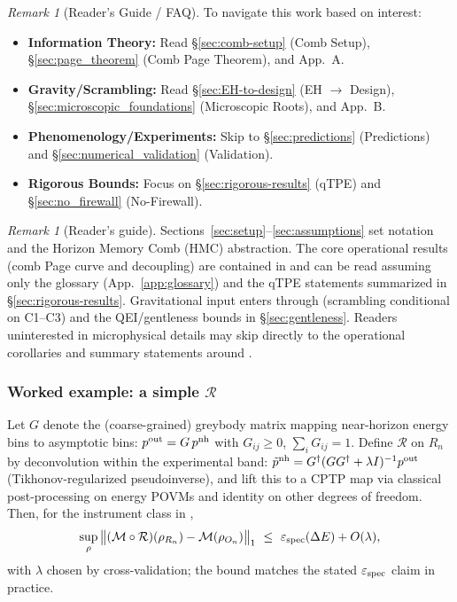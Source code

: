 \documentclass[aps,prd,preprint,onecolumn,superscriptaddress,nofootinbib,longbibliography,floatfix,11pt,showpacs,showkeys]{revtex4-2}
\theoremstyle{plain}
\theoremstyle{definition}
\theoremstyle{remark}
\newtheorem{remark}[theorem]{Remark}
\begin{document}
\begin{remark}[Reader's Guide / FAQ]
To navigate this work based on interest:
\begin{itemize}[leftmargin=*,itemsep=0pt]
    \item \textbf{Information Theory:} Read \S\ref{sec:comb-setup} (Comb Setup), \S\ref{sec:page_theorem} (Comb Page Theorem), and App.~A.
    \item \textbf{Gravity/Scrambling:} Read \S\ref{sec:EH-to-design} (EH $\to$ Design), \S\ref{sec:microscopic_foundations} (Microscopic Roots), and App.~B.
    \item \textbf{Phenomenology/Experiments:} Skip to \S\ref{sec:predictions} (Predictions) and \S\ref{sec:numerical_validation} (Validation).
    \item \textbf{Rigorous Bounds:} Focus on \S\ref{sec:rigorous-results} (qTPE) and \S\ref{sec:no_firewall} (No-Firewall).
\end{itemize}
\end{remark}

\begin{remark}[Reader's guide]\label{rem:readers-guide}
Sections~\ref{sec:setup}--\ref{sec:assumptions} set notation and the Horizon Memory Comb (HMC) abstraction. The core operational results (comb Page curve and decoupling) are contained in  and can be read assuming only the glossary (App.~\ref{app:glossary}) and the qTPE statements summarized in \S\ref{sec:rigorous-results}. Gravitational input enters through  (scrambling conditional on C1--C3) and the QEI/gentleness bounds in \S\ref{sec:gentleness}. Readers uninterested in microphysical details may skip directly to the operational corollaries and summary statements around .
\end{remark}

\subsubsection{Worked example: a simple $\mathcal{R}$}
Let $G$ denote the (coarse-grained) greybody matrix mapping near-horizon energy bins to asymptotic bins:
$p^{\rm out} = G\,p^{\rm nh}$ with $G_{ij}\ge 0$, $\sum_i G_{ij}=1$.
Define $\mathcal{R}$ on $R_n$ by deconvolution within the experimental band:
$\tilde p^{\rm nh} = G^{\dagger}(G G^{\dagger}+\lambda I)^{-1} p^{\rm out}$ (Tikhonov-regularized pseudoinverse),
and lift this to a CPTP map via classical post-processing on energy POVMs and identity on other degrees of freedom.
Then, for the instrument class in ,
\begin{equation*}
\sup_\rho \big\|(\mathcal{M}\circ\mathcal{R})(\rho_{R_n})-\mathcal{M}(\rho_{O_n})\big\|_1
\ \le\ \varepsilon_{\rm spec}(\Delta E) + O(\lambda),
\end{equation*}
with $\lambda$ chosen by cross-validation; the bound matches the stated $\varepsilon_{\rm spec}$ claim in practice.
\end{document}
